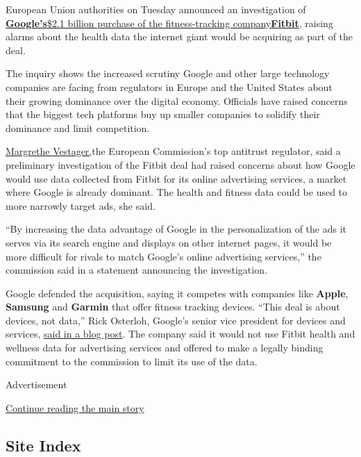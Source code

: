 European Union authorities on Tuesday announced an investigation of
\textbf{\href{https://www.nytimes.com/2019/11/01/technology/google-fitbit.html}{Google's}}\href{https://www.nytimes.com/2019/11/01/technology/google-fitbit.html}{\$2.1
billion purchase of the fitness-tracking
company}\textbf{\href{https://www.nytimes.com/2019/11/01/technology/google-fitbit.html}{Fitbit}},
raising alarms about the health data the internet giant would be
acquiring as part of the deal.

The inquiry shows the increased scrutiny Google and other large
technology companies are facing from regulators in Europe and the United
States about their growing dominance over the digital economy. Officials
have raised concerns that the biggest tech platforms buy up smaller
companies to solidify their dominance and limit competition.

\href{https://ec.europa.eu/commission/presscorner/detail/en/ip_20_1446}{Margrethe
Vestager,}the European Commission's top antitrust regulator, said a
preliminary investigation of the Fitbit deal had raised concerns about
how Google would use data collected from Fitbit for its online
advertising services, a market where Google is already dominant. The
health and fitness data could be used to more narrowly target ads, she
said.

``By increasing the data advantage of Google in the personalization of
the ads it serves via its search engine and displays on other internet
pages, it would be more difficult for rivals to match Google's online
advertising services,'' the commission said in a statement announcing
the investigation.

Google defended the acquisition, saying it competes with companies like
\textbf{Apple}, \textbf{Samsung} and \textbf{Garmin} that offer fitness
tracking devices. ``This deal is about devices, not data,'' Rick
Osterloh, Google's senior vice president for devices and services,
\href{https://blog.google/around-the-globe/google-europe/update-fitbit/}{said
in a blog post}. The company said it would not use Fitbit health and
wellness data for advertising services and offered to make a legally
binding commitment to the commission to limit its use of the data.

Advertisement

\protect\hyperlink{after-bottom}{Continue reading the main story}

\hypertarget{site-index}{%
\subsection{Site Index}\label{site-index}}

